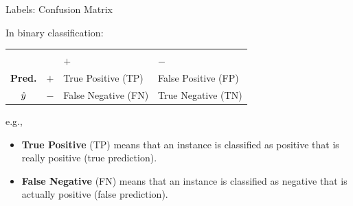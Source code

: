 \documentclass[11pt,compress,t,notes=noshow, xcolor=table]{beamer}
\begin{document}
\begin{vbframe}{Labels: Confusion Matrix}

In binary classification:


\begin{center}
\small
\begin{tabular}{cc|>{\centering\arraybackslash}p{7em}>{\centering\arraybackslash}p{8em}}
    & & \multicolumn{2}{c}{\bfseries True Class $y$} \\
    & & $+$ & $-$ \\
    \hline
    \bfseries Pred.     & $+$ & True Positive (TP)  & False Positive (FP) \\
              $\hat{y}$ & $-$ & False Negative (FN) & True Negative (TN) \\
\end{tabular}
\end{center}
e.g.,
\begin{itemize}
  \item \textbf{True Positive} (TP) means that an instance is classified as 
  positive that is really positive (true prediction).
  \item \textbf{False Negative} (FN) means that an instance is classified as 
  negative that is actually positive (false prediction). 
\end{itemize}

\end{vbframe}

\end{document}
